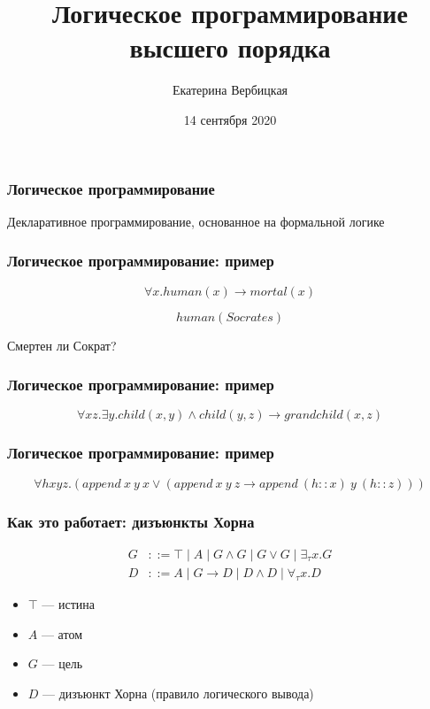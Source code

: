 \documentclass{beamer}
\title[]{Логическое программирование высшего порядка}
\subtitle[]{}
\institute[]{
Лаборатория языков инструментов JetBrains\\
}
\author[]{Екатерина Вербицкая}
\date{14 сентября 2020}
\begin{document}
{
  \begin{frame}
    \titlepage
  \end{frame}
}


\begin{frame}[fragile]
  \frametitle{Логическое программирование}
\begin{center}
  Декларативное программирование, основанное на формальной логике
\end{center}
\end{frame}

\begin{frame}[fragile]
  \frametitle{Логическое программирование: пример}
\[
  \forall x. human(x) \to mortal(x)
\]

\[
  human(Socrates)
\]

\vspace{1cm}

\begin{center}
  Смертен ли Сократ?
\end{center}
\end{frame}

\begin{frame}[fragile]
  \frametitle{Логическое программирование: пример}
\[
  \forall x z. \exists y. child (x,y) \wedge child(y,z) \to grandchild(x,z)
\]
\end{frame}

\begin{frame}[fragile]
  \frametitle{Логическое программирование: пример}
\[
  \forall h x y z. (append \ x \ y \ x \vee (append \ x \ y \ z \to append \ (h :: x) \  y \ (h :: z)))
\]
\end{frame}

\begin{frame}[fragile]
  \frametitle{Как это работает: дизъюнкты Хорна}

  \begin{align*}
    G &::= \top \mid A \mid G \wedge G \mid G \vee G \mid \exists_{\tau} x. G \\
    D &::= A \mid G \to D \mid D \wedge D \mid \forall_{\tau} x. D
  \end{align*}

  \vspace{1cm}

  \begin{itemize}
    \item $\top$ --- истина
    \item $A$ --- атом
    \item $G$ --- цель
    \item $D$ --- дизъюнкт Хорна (правило логического вывода)
  \end{itemize}
\end{frame}
\end{document}

